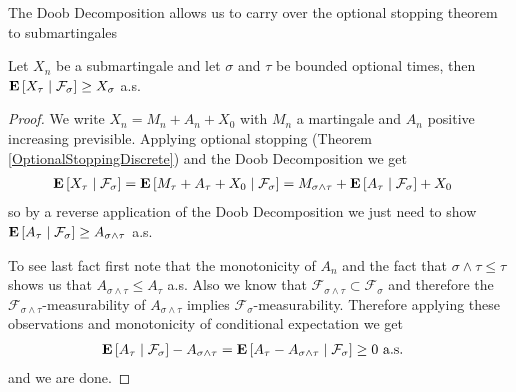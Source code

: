 The Doob Decomposition allows us to carry over the optional
stopping theorem to submartingales
\begin{cor}\label{OptionalStoppingSubmartingaleDiscrete}Let $X_n$ be a submartingale and let $\sigma$ and $\tau$ be
  bounded optional times, then
  $\cexpectationlong{\mathcal{F}_\sigma}{X_\tau} \geq X_\sigma$ a.s.
\end{cor}
\begin{proof}
We write $X_n = M_n + A_n + X_0$ with $M_n$ a martingale and $A_n$ positive
increasing previsible.  Applying optional stopping (Theorem
\ref{OptionalStoppingDiscrete}) and the Doob Decomposition we get
\begin{align*}
\cexpectationlong{\mathcal{F}_\sigma}{X_\tau} &=
\cexpectationlong{\mathcal{F}_\sigma}{M_\tau + A_\tau + X_0} = M_{\sigma
  \wedge \tau} + \cexpectationlong{\mathcal{F}_\sigma}{A_\tau} + X_0
\end{align*}
so by a reverse application of the Doob Decomposition 
we just need to show $\cexpectationlong{\mathcal{F}_\sigma}{A_\tau}
\geq A_{\sigma \wedge \tau}$ a.s.

To see last fact first note that the monotonicity of $A_n$ and the
fact that $\sigma \wedge \tau \leq \tau$ shows us that $A_{\sigma
  \wedge \tau} \leq A_\tau$ a.s.  
Also we know that $\mathcal{F}_{\sigma \wedge
  \tau} \subset \mathcal{F}_\sigma$ and therefore the
$\mathcal{F}_{\sigma \wedge \tau}$-measurability of $A_{\sigma \wedge
  \tau}$ implies $\mathcal{F}_\sigma$-measurability.  Therefore
applying these observations and monotonicity of conditional
expectation we get
\begin{align*}
\cexpectationlong{\mathcal{F}_\sigma}{A_\tau} - A_{\sigma \wedge \tau}
&= \cexpectationlong{\mathcal{F}_\sigma}{A_\tau - A_{\sigma \wedge
    \tau}} \geq 0 \text{ a.s.}
\end{align*}
and we are done.
\end{proof}

